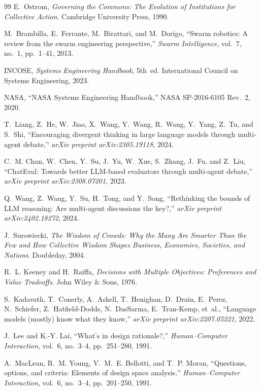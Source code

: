 \documentclass[11pt,a4paper]{article}
\begin{document}
\begin{thebibliography}{99}
E.~Ostrom, \emph{Governing the Commons: The Evolution of Institutions for Collective Action}. Cambridge University Press, 1990.

M.~Brambilla, E.~Ferrante, M.~Birattari, and M.~Dorigo, ``Swarm robotics: A review from the swarm engineering perspective,'' \emph{Swarm Intelligence}, vol.~7, no.~1, pp.~1--41, 2013.

INCOSE, \emph{Systems Engineering Handbook}, 5th~ed. International Council on Systems Engineering, 2023.

NASA, ``NASA Systems Engineering Handbook,'' NASA SP-2016-6105 Rev.~2, 2020.

T.~Liang, Z.~He, W.~Jiao, X.~Wang, Y.~Wang, R.~Wang, Y.~Yang, Z.~Tu, and S.~Shi, ``Encouraging divergent thinking in large language models through multi-agent debate,'' \emph{arXiv preprint arXiv:2305.19118}, 2024.

C.~M. Chan, W.~Chen, Y.~Su, J.~Yu, W.~Xue, S.~Zhang, J.~Fu, and Z.~Liu, ``ChatEval: Towards better LLM-based evaluators through multi-agent debate,'' \emph{arXiv preprint arXiv:2308.07201}, 2023.

Q.~Wang, Z.~Wang, Y.~Su, H.~Tong, and Y.~Song, ``Rethinking the bounds of LLM reasoning: Are multi-agent discussions the key?,'' \emph{arXiv preprint arXiv:2402.18272}, 2024.

J.~Surowiecki, \emph{The Wisdom of Crowds: Why the Many Are Smarter Than the Few and How Collective Wisdom Shapes Business, Economies, Societies, and Nations}. Doubleday, 2004.

R.~L. Keeney and H.~Raiffa, \emph{Decisions with Multiple Objectives: Preferences and Value Tradeoffs}. John Wiley \& Sons, 1976.

S.~Kadavath, T.~Conerly, A.~Askell, T.~Henighan, D.~Drain, E.~Perez, N.~Schiefer, Z.~Hatfield-Dodds, N.~DasSarma, E.~Tran-Kemp, et~al., ``Language models (mostly) know what they know,'' \emph{arXiv preprint arXiv:2207.05221}, 2022.

J.~Lee and K.-Y. Lai, ``What's in design rationale?,'' \emph{Human--Computer Interaction}, vol.~6, no.~3--4, pp.~251--280, 1991.

A.~MacLean, R.~M. Young, V.~M.~E. Bellotti, and T.~P. Moran, ``Questions, options, and criteria: Elements of design space analysis,'' \emph{Human--Computer Interaction}, vol.~6, no.~3--4, pp.~201--250, 1991.


\end{thebibliography}
\end{document}
